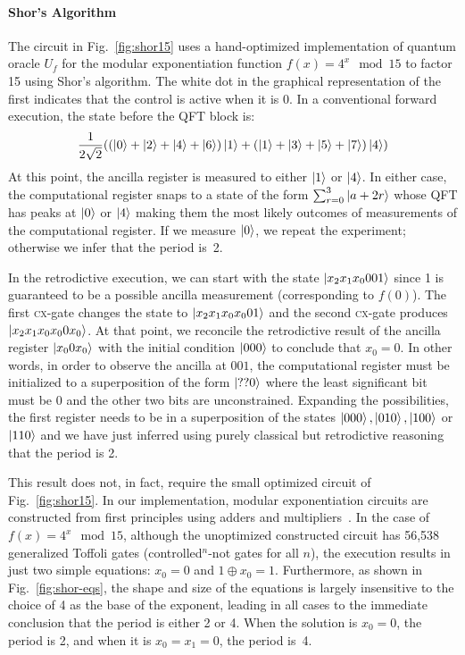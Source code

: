 \documentclass{article}
\newcommand{\cx}{\textsc{cx}}
\begin{document}
\begin{refsection}
\paragraph*{Shor's Algorithm}
The circuit in Fig.~\ref{fig:shor15} uses a hand-optimized
implementation of quantum oracle $U_f$ for the modular exponentiation
function $f(x) = 4^x \mod{15}$ to factor 15 using Shor's
algorithm. The white dot in the graphical representation of the first
indicates that the control is active when it is 0. In a conventional
forward execution, the state before the QFT block is:
\[
\frac{1}{2\sqrt{2}} (
  (\ket{0} + \ket{2} + \ket{4} + \ket{6}) \ket{1} + 
  (\ket{1} + \ket{3} + \ket{5} + \ket{7}) \ket{4}
  )
\]
At this point, the ancilla register is measured to either $\ket{1}$ or
$\ket{4}$. In either case, the computational register snaps to a state
of the form $\sum_{r=0}^3 \ket{a+2r}$ whose QFT has peaks at $\ket{0}$
or $\ket{4}$ making them the most likely outcomes of measurements of
the computational register. If we measure $\ket{0}$, we repeat the
experiment; otherwise we infer that the period is~2.

In the retrodictive execution, we can start with the state
$\ket{x_2x_1x_0001}$ since 1 is guaranteed to be a possible ancilla
measurement (corresponding to $f(0)$). The first \cx-gate changes the
state to $\ket{x_2x_1x_0x_001}$ and the second \cx-gate produces
$\ket{x_2x_1x_0x_00x_0}$. At that point, we reconcile the retrodictive
result of the ancilla register $\ket{x_00x_0}$ with the initial
condition $\ket{000}$ to conclude that $x_0=0$. In other words, in
order to observe the ancilla at $001$, the computational register must
be initialized to a superposition of the form $\ket{??0}$ where the
least significant bit must be 0 and the other two bits are
unconstrained. Expanding the possibilities, the first register needs
to be in a superposition of the states $\ket{000}, \ket{010},
\ket{100}$ or $\ket{110}$ and we have just inferred using purely
classical but retrodictive reasoning that the period is
2.

This result does not, in fact, require the small optimized circuit of
Fig.~\ref{fig:shor15}. In our implementation, modular exponentiation
circuits are constructed from first principles using adders and
multipliers~\cite{PhysRevA.54.147}. In the case of $f(x) = 4^x
\mod{15}$, although the unoptimized constructed circuit has 56,538
generalized Toffoli gates (controlled$^{n}$-not gates for all $n$),
the execution results in just two simple equations: $x_0 = 0$ and $1
\oplus x_0 = 1$. Furthermore, as shown in Fig.~\ref{fig:shor-eqs}, the
shape and size of the equations is largely insensitive to the choice
of 4 as the base of the exponent, leading in all cases to the
immediate conclusion that the period is either 2 or 4. When the
solution is $x_0=0$, the period is 2, and when it is $x_0=x_1=0$, the
period is~4.


\end{refsection}
\end{document}
